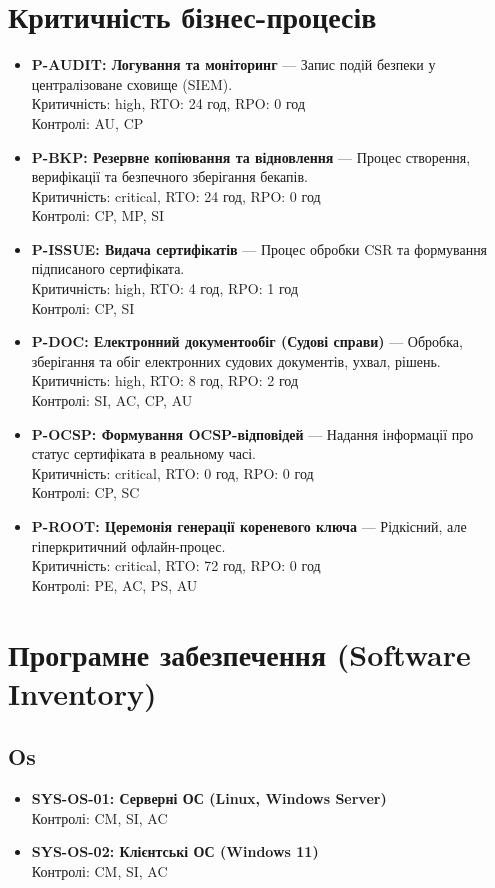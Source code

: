 \documentclass{article}
\begin{document}
\section{Критичність бізнес-процесів}
\begin{itemize}
\item \textbf{P-AUDIT: Логування та моніторинг} — Запис подій безпеки у централізоване сховище (SIEM).
\\ Критичність: high, RTO: 24 год, RPO: 0 год
\\ Контролі: AU, CP
\item \textbf{P-BKP: Резервне копіювання та відновлення} — Процес створення, верифікації та безпечного зберігання бекапів.
\\ Критичність: critical, RTO: 24 год, RPO: 0 год
\\ Контролі: CP, MP, SI
\item \textbf{P-ISSUE: Видача сертифікатів} — Процес обробки CSR та формування підписаного сертифіката.
\\ Критичність: high, RTO: 4 год, RPO: 1 год
\\ Контролі: CP, SI
\item \textbf{P-DOC: Електронний документообіг (Судові справи)} — Обробка, зберігання та обіг електронних судових документів, ухвал, рішень.
\\ Критичність: high, RTO: 8 год, RPO: 2 год
\\ Контролі: SI, AC, CP, AU
\item \textbf{P-OCSP: Формування OCSP-відповідей} — Надання інформації про статус сертифіката в реальному часі.
\\ Критичність: critical, RTO: 0 год, RPO: 0 год
\\ Контролі: CP, SC
\item \textbf{P-ROOT: Церемонія генерації кореневого ключа} — Рідкісний, але гіперкритичний офлайн-процес.
\\ Критичність: critical, RTO: 72 год, RPO: 0 год
\\ Контролі: PE, AC, PS, AU
\end{itemize}


\newpage
\section{Програмне забезпечення (Software Inventory)}
\subsection{Os}
\begin{itemize}
\item \textbf{SYS-OS-01: Серверні ОС (Linux, Windows Server)}
\\ Контролі: CM, SI, AC
\item \textbf{SYS-OS-02: Клієнтські ОС (Windows 11)}
\\ Контролі: CM, SI, AC
\end{itemize}
\end{document}
